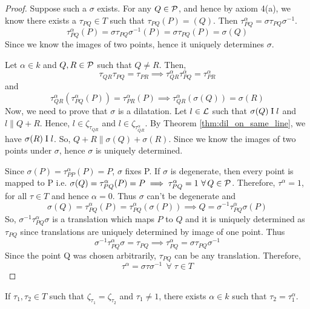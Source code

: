 \begin{proof}
    Suppose such a $\sigma$ exists. For any $Q \in \mathcal{P}$, and hence by axiom 4(a), we know there exists a $\tau_{PQ} \in T$ such that $\tau_{PQ}(P)=(Q)$. Then $\tau_{PQ}^\alpha = \sigma \tau_{PQ} \sigma^{-1}$.
    \[ 
    \tau_{PQ}^\alpha(P) = \sigma \tau_{PQ} \sigma^{-1}(P) = \sigma \tau_{PQ}(P) = \sigma (Q)
    \]
    Since we know the images of two points, hence it uniquely determines $\sigma$.

    \noindent
    Let $\alpha \in k$ and $Q, R \in \mathcal{P}$ such that $Q \neq R$. Then, 
    \[ \tau_{QR}\tau_{PQ}=\tau_{PR} \implies \tau_{QR}^\alpha\tau_{PQ}^\alpha=\tau_{PR}^\alpha \]
    and
    \[ \tau_{QR}^\alpha(\tau_{PQ}^\alpha (P))=\tau_{PR}^\alpha(P) \implies \tau_{QR}^\alpha(\sigma(Q))=\sigma(R) \]   
    Now, we need to prove that $\sigma$ is a dilatation. Let $l \in \mathcal{L}$ such that $\sigma(Q) \mathrel\text{I} l$ and $l \parallel Q+R$. Hence, $l \in \zeta_{\tau_{QR}}$ and $l \in \zeta_{\tau_{QR}^{\alpha}}$. By Theorem \ref{thm:dil_on_same_line}, we have $\sigma(R) \mathrel\text{I} l$. So, $Q+R \parallel \sigma(Q)+ \sigma(R)$.
    Since we know the images of two points under $\sigma$, hence $\sigma$ is uniquely determined.

    \vspace{1ex}

    Since $\sigma(P) = \tau_{PP}^\alpha(P)=P$, $\sigma$ fixes P. If $\sigma$ is degenerate, then every point is mapped to P i.e. $\sigma(Q) = \tau_{PQ}^{\alpha}(P) = P \implies \tau_{PQ}^{\alpha} = 1\ \forall\, Q \in \mathcal{P}$. Therefore, $\tau^\alpha = 1$, for all $\tau \in T$ and hence $\alpha=0$. Thus $\sigma$ can't be degenerate and
    \[
    \sigma(Q)=\tau_{PQ}^{\alpha}(P)= \tau_{PQ}^{\alpha}(\sigma(P)) \implies Q = \sigma^{-1}\tau_{PQ}^{\alpha}\sigma(P)
    \]
    So, $\sigma^{-1}\tau_{PQ}^{\alpha}\sigma$ is a translation which maps $P$ to $Q$ and it is uniquely determined as $\tau_{PQ}$ since translations are uniquely determined by image of one point. Thus
    \[
    \sigma^{-1}\tau_{PQ}^{\alpha}\sigma = \tau_{PQ} \implies \tau_{PQ}^{\alpha} = \sigma\tau_{PQ}\sigma^{-1}
    \]
    Since the point Q was chosen arbitrarily, $\tau_{PQ}$ can be any translation. Therefore,
    \[
    \tau^{\alpha} = \sigma\tau\sigma^{-1} \: \: \forall \; \tau \in T
    \]
\end{proof}

\begin{axiom}[4b]
    If $\tau_1, \tau_2 \in T$ such that $\zeta_{\tau_1} = \zeta_{\tau_2}$ and $\tau_1 \neq 1$, there exists $\alpha \in k$ such that $\tau_2 = \tau_1^\alpha$.
\end{axiom}

